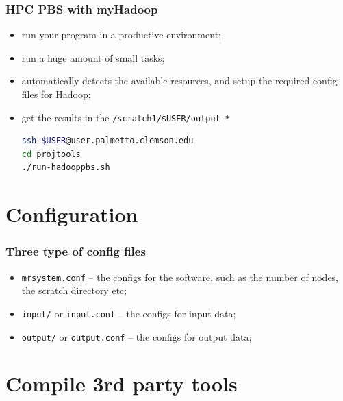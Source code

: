 \documentclass{beamer}
\theoremstyle{definition}
\theoremstyle{remark}
\begin{document}
\begin{frame}[fragile]
  \frametitle<presentation>{HPC PBS with myHadoop}

    \begin{itemize}
      \item run your program in a productive environment;
      \item run a huge amount of small tasks;
      \item automatically detects the available resources,
            and setup the required config files for Hadoop;

      \item get the results in the \texttt{/scratch1/\${USER}/output-*}
\begin{lstlisting}[language=bash]
ssh $USER@user.palmetto.clemson.edu
cd projtools
./run-hadooppbs.sh
\end{lstlisting}
    \end{itemize}

\end{frame}


\section{Configuration}


\begin{frame}[fragile]
  \frametitle<presentation>{Three type of config files}

    \begin{itemize}
      \item \texttt{mrsystem.conf} -- the configs for the software, such as the number of nodes, the scratch directory etc;
      \item \texttt{input/} or \texttt{input.conf} -- the configs for input data;
      \item \texttt{output/} or \texttt{output.conf} -- the configs for output data;
    \end{itemize}

\end{frame}



\section{Compile 3rd party tools}
\end{document}
